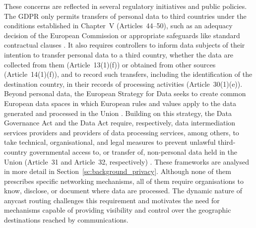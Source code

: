 \documentclass[
A4paper,                %
twoside,                %
openright,              %
chapterprefix=true,     %
12pt,                   %
headings=normal,        %
titlepage=on            %
]{book}
\begin{document}
These concerns are reflected in several regulatory initiatives and public policies. The GDPR only permits transfers of personal data to third countries under the conditions established in Chapter~V (Articles~44--50), such as an adequacy decision of the European Commission or appropriate safeguards like standard contractual clauses \cite{REGULATIONSRelevance}. It also requires controllers to inform data subjects of their intention to transfer personal data to a third country, whether the data are collected from them (Article~13(1)(f)) or obtained from other sources (Article~14(1)(f)), and to record such transfers, including the identification of the destination country, in their records of processing activities (Article~30(1)(e)). Beyond personal data, the European Strategy for Data seeks to create common European data spaces in which European rules and values apply to the data generated and processed in the Union \cite{COMMUNICATIONData}. Building on this strategy, the Data Governance Act and the Data Act require, respectively, data intermediation services providers and providers of data processing services, among others, to take technical, organisational, and legal measures to prevent unlawful third-country governmental access to, or transfer of, non-personal data held in the Union (Article~31 and Article~32, respectively) \cite{2022DataActb, 2022DataAct}. These frameworks are analysed in more detail in Section~\ref{sc:background_privacy}. Although none of them prescribes specific networking mechanisms, all of them require organisations to know, disclose, or document where data are processed. The dynamic nature of anycast routing challenges this requirement and motivates the need for mechanisms capable of providing visibility and control over the geographic destinations reached by communications.
\end{document}
